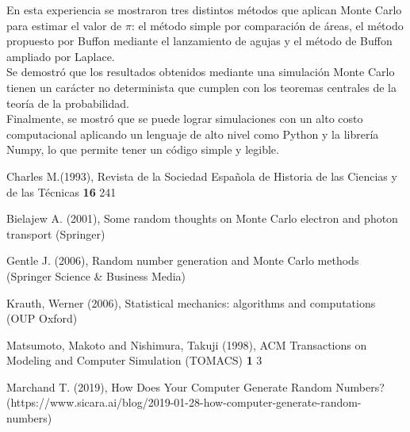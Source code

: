 \documentclass{rbf}
\begin{document}
En esta experiencia se mostraron tres distintos métodos que aplican Monte Carlo para estimar el valor de $\pi$: el método simple por comparación de áreas, el método propuesto por Buffon mediante el lanzamiento de agujas y el método de Buffon ampliado por Laplace. \\
Se demostró que los resultados obtenidos mediante una simulación Monte Carlo tienen un carácter no determinista que cumplen con los teoremas centrales de la teoría de la probabilidad. \\

Finalmente, se mostró que se puede lograr simulaciones con un alto costo computacional aplicando un lenguaje de alto nivel como Python y la librería Numpy, lo que permite tener un código simple y legible.



\begin{thebibliography}

Charles M.(1993), Revista de la Sociedad Espa{\~n}ola de Historia de las Ciencias y de las T{\'e}cnicas {\bf 16} 241

Bielajew A. (2001), Some random thoughts on Monte Carlo electron and photon transport (Springer)

Gentle J. (2006), Random number generation and Monte Carlo methods (Springer Science \& Business Media)

Krauth, Werner (2006), Statistical mechanics: algorithms and computations (OUP Oxford)

Matsumoto, Makoto and Nishimura, Takuji (1998), ACM Transactions on Modeling and Computer Simulation (TOMACS) {\bf 1} 3

Marchand T. (2019), How Does Your Computer Generate Random Numbers? (https://www.sicara.ai/blog/2019-01-28-how-computer-generate-random-numbers)

\end{thebibliography}
\end{document}
